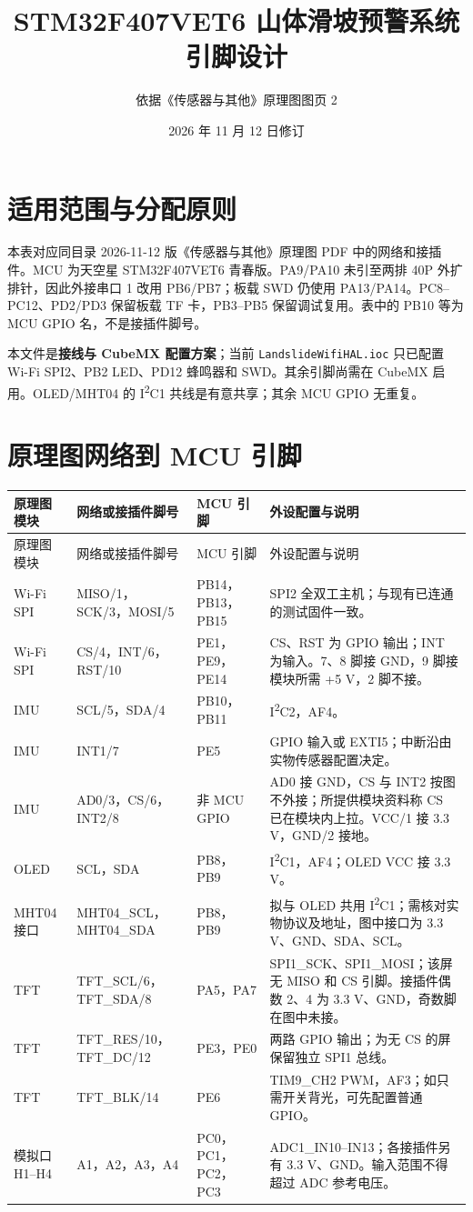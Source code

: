 \documentclass[UTF8,10pt,a4paper,fontset=fandol]{ctexart}
\title{STM32F407VET6 山体滑坡预警系统引脚设计}
\author{依据《传感器与其他》原理图图页 2}
\date{2026 年 11 月 12 日修订}
\begin{document}
\maketitle

\section{适用范围与分配原则}
本表对应同目录 2026-11-12 版《传感器与其他》原理图 PDF 中的网络和接插件。MCU 为天空星 STM32F407VET6 青春版。PA9/PA10 未引至两排 40P 外扩排针，因此外接串口 1 改用 PB6/PB7；板载 SWD 仍使用 PA13/PA14。PC8--PC12、PD2/PD3 保留板载 TF 卡，PB3--PB5 保留调试复用。表中的 PB10 等为 MCU GPIO 名，不是接插件脚号。

本文件是\textbf{接线与 CubeMX 配置方案}；当前 \texttt{LandslideWifiHAL.ioc} 只已配置 Wi-Fi SPI2、PB2 LED、PD12 蜂鸣器和 SWD。其余引脚尚需在 CubeMX 启用。OLED/MHT04 的 I\textsuperscript{2}C1 共线是有意共享；其余 MCU GPIO 无重复。

\section{原理图网络到 MCU 引脚}
\small
\begin{longtable}{L{26mm}L{35mm}L{32mm}L{62mm}}
\toprule
原理图模块 & 网络或接插件脚号 & MCU 引脚 & 外设配置与说明\\
\midrule
\endfirsthead
\toprule
原理图模块 & 网络或接插件脚号 & MCU 引脚 & 外设配置与说明\\
\midrule
\endhead
Wi-Fi SPI & MISO/1，SCK/3，MOSI/5 & PB14，PB13，PB15 & SPI2 全双工主机；与现有已连通的测试固件一致。\\
Wi-Fi SPI & CS/4，INT/6，RST/10 & PE1，PE9，PE14 & CS、RST 为 GPIO 输出；INT 为输入。7、8 脚接 GND，9 脚接模块所需 +5 V，2 脚不接。\\
IMU & SCL/5，SDA/4 & PB10，PB11 & I\textsuperscript{2}C2，AF4。\\
IMU & INT1/7 & PE5 & GPIO 输入或 EXTI5；中断沿由实物传感器配置决定。\\
IMU & AD0/3，CS/6，INT2/8 & 非 MCU GPIO & AD0 接 GND，CS 与 INT2 按图不外接；所提供模块资料称 CS 已在模块内上拉。VCC/1 接 3.3 V，GND/2 接地。\\
OLED & SCL，SDA & PB8，PB9 & I\textsuperscript{2}C1，AF4；OLED VCC 接 3.3 V。\\
MHT04 接口 & MHT04\_SCL，MHT04\_SDA & PB8，PB9 & 拟与 OLED 共用 I\textsuperscript{2}C1；需核对实物协议及地址，图中接口为 3.3 V、GND、SDA、SCL。\\
TFT & TFT\_SCL/6，TFT\_SDA/8 & PA5，PA7 & SPI1\_SCK、SPI1\_MOSI；该屏无 MISO 和 CS 引脚。接插件偶数 2、4 为 3.3 V、GND，奇数脚在图中未接。\\
TFT & TFT\_RES/10，TFT\_DC/12 & PE3，PE0 & 两路 GPIO 输出；为无 CS 的屏保留独立 SPI1 总线。\\
TFT & TFT\_BLK/14 & PE6 & TIM9\_CH2 PWM，AF3；如只需开关背光，可先配置普通 GPIO。\\
模拟口 H1--H4 & A1，A2，A3，A4 & PC0，PC1，PC2，PC3 & ADC1\_IN10--IN13；各接插件另有 3.3 V、GND。输入范围不得超过 ADC 参考电压。\\
\bottomrule
\end{longtable}
\normalsize
\end{document}

